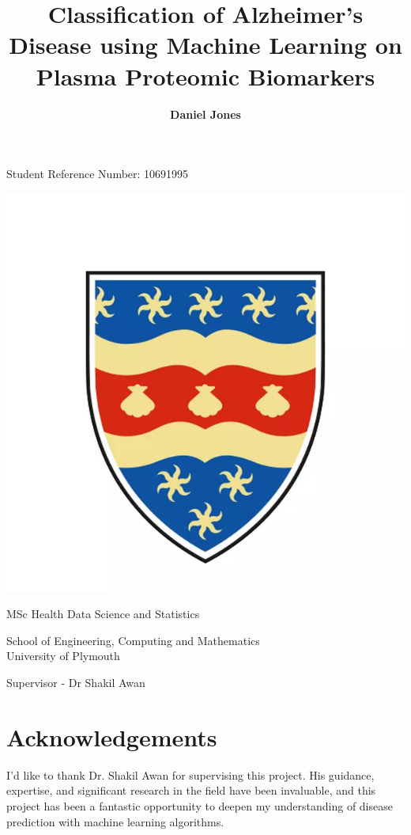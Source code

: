 \documentclass[a4paper,12pt]{article}
\title{\textbf{Classification of Alzheimer's Disease using Machine Learning on Plasma Proteomic Biomarkers}}
\author{\textbf{Daniel Jones}}
\begin{document}
\maketitle
{}
\begin{center}
    Student Reference Number: 10691995
\end{center}
\begin{center}
    \includegraphics[scale = 0.4]{Pics/shield.png}
\end{center}
\begin{center}
    MSc Health Data Science and Statistics
\end{center}
\begin{center}
    School of Engineering, Computing and Mathematics \\ University of Plymouth
\end{center}
\begin{center}
    Supervisor - Dr Shakil Awan
\end{center}

\section*{Acknowledgements}

I’d like to thank Dr. Shakil Awan for supervising this project. His guidance, expertise, and significant research in the field have been invaluable, and this project has been a fantastic opportunity to deepen my understanding of disease prediction with machine learning algorithms.
\end{document}
